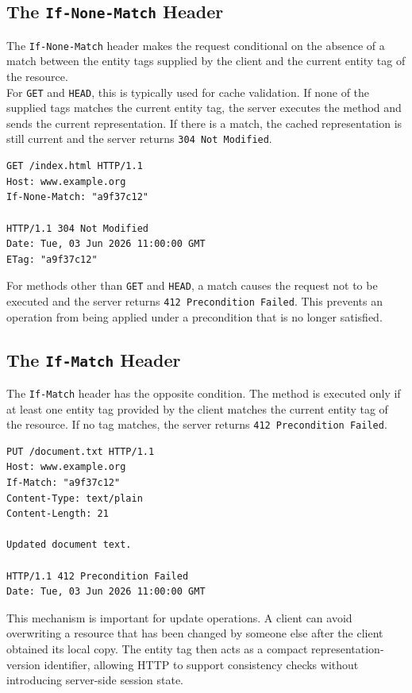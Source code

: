 \documentclass{scrbook}
\begin{document}
\subsection{The \texttt{If-None-Match} Header}

The \texttt{If-None-Match} header makes the request conditional on the absence of a match between the entity tags supplied by the client and the current entity tag of the resource.\\

For \texttt{GET} and \texttt{HEAD}, this is typically used for cache validation. If none of the supplied tags matches the current entity tag, the server executes the method and sends the current representation. If there is a match, the cached representation is still current and the server returns \texttt{304 Not Modified}.

\begin{lstlisting}
GET /index.html HTTP/1.1
Host: www.example.org
If-None-Match: "a9f37c12"

HTTP/1.1 304 Not Modified
Date: Tue, 03 Jun 2026 11:00:00 GMT
ETag: "a9f37c12"
\end{lstlisting}

For methods other than \texttt{GET} and \texttt{HEAD}, a match causes the request not to be executed and the server returns \texttt{412 Precondition Failed}. This prevents an operation from being applied under a precondition that is no longer satisfied.

\subsection{The \texttt{If-Match} Header}

The \texttt{If-Match} header has the opposite condition. The method is executed only if at least one entity tag provided by the client matches the current entity tag of the resource. If no tag matches, the server returns \texttt{412 Precondition Failed}.

\begin{lstlisting}
PUT /document.txt HTTP/1.1
Host: www.example.org
If-Match: "a9f37c12"
Content-Type: text/plain
Content-Length: 21

Updated document text.

HTTP/1.1 412 Precondition Failed
Date: Tue, 03 Jun 2026 11:00:00 GMT
\end{lstlisting}

This mechanism is important for update operations. A client can avoid overwriting a resource that has been changed by someone else after the client obtained its local copy. The entity tag then acts as a compact representation-version identifier, allowing HTTP to support consistency checks without introducing server-side session state.
\end{document}
